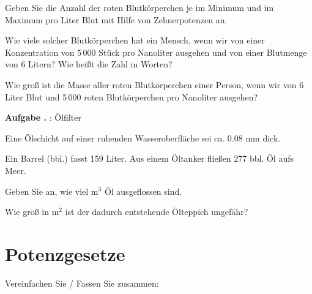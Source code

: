 \begin{bbwAufgabenBlock}
\item Geben Sie die Anzahl der roten Blutkörperchen je im Minimum und
im Maximum pro Liter Blut mit Hilfe von Zehnerpotenzen
an.

\item Wie viele solcher Blutkörperchen hat ein Mensch, wenn wir von
einer Konzentration von 5\,000 Stück pro Nanoliter ausgehen und von
einer Blutmenge von 6 Litern? Wie heißt die Zahl in Worten?

\item Wie groß ist die Masse aller roten Blutkörperchen einer Person,
wenn wir von 6 Liter Blut und 5\,000 roten Blutkörperchen pro
Nanoliter ausgehen?
\end{bbwAufgabenBlock}

\TNTeop{}


\textbf{Aufgabe .} : Ölfilter

Eine Ölschicht auf einer ruhenden Wasseroberfläche sei ca. 0.08 mm
dick.

Ein Barrel (bbl.) fasst 159 Liter. Aus einem Öltanker fließen 277 bbl.
Öl aufs Meer.

\begin{bbwAufgabenBlock}
\item Geben Sie an, wie viel m$^3$ Öl ausgeflossen sind.


\item Wie groß in m$^2$ ist der dadurch entstehende Ölteppich ungefähr?

\end{bbwAufgabenBlock}

\TNTeop{}

\newpage
\section{Potenzgesetze}
Vereinfachen Sie / Fassen Sie zusammen:

